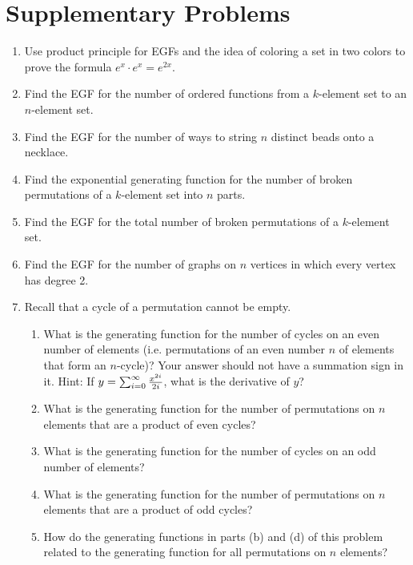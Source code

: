 \section{Supplementary Problems}
\begin{enumerate} 

\item Use product principle for EGFs and the idea of coloring
a set in two colors to prove the formula $e^x\cdot e^x = e^{2x}.$

\item Find the EGF for the number of ordered functions from a $k$-element
set to an $n$-element set.

\item Find the EGF for the number of ways to string $n$ distinct beads
onto a necklace.

\item Find the exponential generating function for the number of broken
permutations of a $k$-element set into $n$ parts.

\item Find the EGF for the total number of broken permutations of a
$k$-element set.

\item Find the EGF for the number of graphs on $n$ vertices in which every
vertex has degree 2.

\item Recall that a cycle of a permutation cannot be empty.
\begin{enumerate}  
\item What is the generating function for the number of
cycles on an even number of elements (i.e. permutations of an even number
$n$ of elements that form an
$n$-cycle)?  Your answer should not have a summation sign in it.  Hint: 
If
$y=
\sum_{i=0}^\infty {x^{2i}\over 2i}$, what is the derivative of $y$?
\item What is the generating function for the number of permutations on
$n$ elements that are a product of even cycles?
\item What is the generating function for the number of cycles on an odd
number of elements?
\item What is the generating function for the number of permutations on
$n$ elements that are a product of odd cycles?
\item How do the generating functions in parts (b) and (d) of this
problem related to the generating function for all permutations on $n$
elements?

\end{enumerate}

\end{enumerate}

